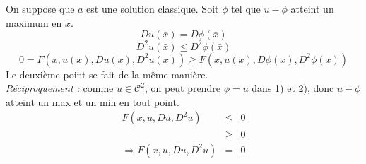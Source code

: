 \begin{dem}
On suppose que $a$ est une solution classique. Soit $\phi$ tel que $u-\phi$ atteint un maximum en $\bar{x}$.
	\[Du(\bar{x})=D\phi(\bar{x})\]
	\[D^2u(\bar{x})\leq D^2\phi(\bar{x})\]
\[0=F(\bar{x}, u(\bar{x}), Du(\bar{x}), D^2u(\bar{x}))\geq F(\bar{x}, u(\bar{x}), D\phi(\bar{x}), D^2\phi(\bar{x}))\]
Le deuxième point se fait de la même manière.\\
\textit{Réciproquement :} comme $u\in\mathscr{C}^2$, on peut prendre $\phi=u$ dans 1) et 2), donc $u-\phi$ atteint un max et un min en tout point.
\begin{eqnarray*}
	F(x,u,Du,D^2u)&\leq&0\\
			&\geq&0\\
	\Rightarrow F(x,u,Du,D^2u)&=&0\\
\end{eqnarray*}
\end{dem}
